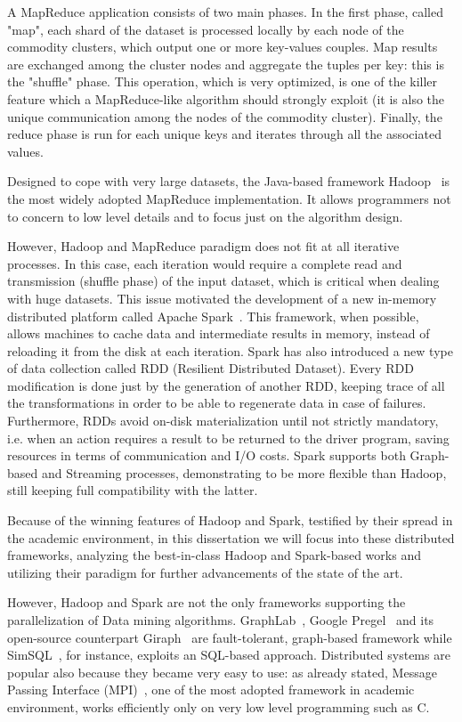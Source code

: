 A MapReduce application consists of two main phases. In the first phase, called "map", each shard of the dataset is processed locally by each node of the commodity clusters, which output one or more key-values couples. Map results are exchanged among the cluster nodes and aggregate the tuples per key: this is the "shuffle" phase. This operation, which is very optimized, is one of the killer feature which a MapReduce-like algorithm should strongly exploit (it is also the unique communication among the nodes of the commodity cluster). Finally, the reduce phase is run for each unique keys and iterates through all the associated values.

Designed to cope with very large datasets, the Java-based framework Hadoop~\cite{HDFS} is the most widely adopted MapReduce implementation. It allows programmers not to concern to low level details and to focus just on the algorithm design.

However, Hadoop and MapReduce paradigm does not fit at all iterative processes. In this case, each iteration would require a complete read and transmission (shuffle phase) of the input dataset, which is critical when dealing with huge datasets. This issue motivated the development of a new in-memory distributed platform called Apache Spark~\cite{Zaharia_spark}. This framework, when possible, allows machines to cache data and intermediate results in memory, instead of reloading it from the disk at each iteration. Spark has also introduced a new type of data collection called RDD (Resilient Distributed Dataset). Every RDD modification is done just by the generation of another RDD, keeping trace of all the transformations in order to be able to regenerate data in case of failures. Furthermore, RDDs avoid on-disk materialization until not strictly mandatory, i.e. when an action requires a result to be returned to the driver program, saving resources in terms of communication and I/O costs. Spark supports both Graph-based and Streaming processes, demonstrating to be more flexible than Hadoop, still keeping full compatibility with the latter. 

Because of the winning features of Hadoop and Spark, testified by their spread in the academic environment, in this dissertation we will focus into these distributed frameworks, analyzing the best-in-class Hadoop and Spark-based works and utilizing their paradigm for further advancements of the state of the art.

However, Hadoop and Spark are
not the only frameworks supporting the parallelization of Data mining
algorithms. GraphLab~\cite{graphlab}, Google Pregel~\cite{pregel} and its
open-source counterpart Giraph~\cite{giraph} are fault-tolerant, graph-based
framework while SimSQL~\cite{simsql}, for instance, exploits an SQL-based
approach. Distributed systems are popular also because they became very easy to
use: as already stated, Message Passing Interface (MPI)~\cite{mpi}, one of the most adopted
framework in academic environment, works efficiently only on very low level
programming such as C.

